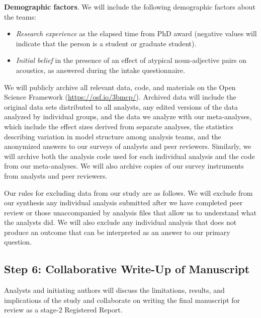 \documentclass[
  english,
  man,floatsintext]{apa6}
\providecommand{\tightlist}{%
  \setlength{\itemsep}{0pt}\setlength{\parskip}{0pt}}
\begin{document}
\textbf{Demographic factors}. We will include the following demographic factors about the  teams:

\begin{itemize}
\tightlist
\item
  \emph{Research experience} as the elapsed time from PhD award (negative values will indicate that the person is a student or graduate student).
\item
  \emph{Initial belief} in the presence of an effect of atypical noun-adjective pairs on acoustics, as answered during the intake questionnaire.
\end{itemize}

We will publicly archive all relevant data, code, and materials on the Open Science Framework (\url{https://osf.io/3bmcp/}).
Archived data will include the original data sets distributed to all analysts, any edited versions of the data analyzed by individual groups, and the data we analyze with our meta-analyses, which include the effect sizes derived from separate analyses, the statistics describing variation in model structure among analysis teams, and the anonymized answers to our surveys of analysts and peer reviewers.
Similarly, we will archive both the analysis code used for each individual analysis and the code from our meta-analyses.
We will also archive copies of our survey instruments from analysts and peer reviewers.

Our rules for excluding data from our study are as follows.
We will exclude from our synthesis any individual analysis submitted after we have completed peer review or those unaccompanied by analysis files that allow us to understand what the analysts did.
We will also exclude any individual analysis that does not produce an outcome that can be interpreted as an answer to our primary question.

\hypertarget{step-6-collaborative-write-up-of-manuscript}{%
\subsection{Step 6: Collaborative Write-Up of Manuscript}\label{step-6-collaborative-write-up-of-manuscript}}

Analysts and initiating authors will discuss the limitations, results, and implications of the study and collaborate on writing the final manuscript for review as a stage-2 Registered Report.
\end{document}
